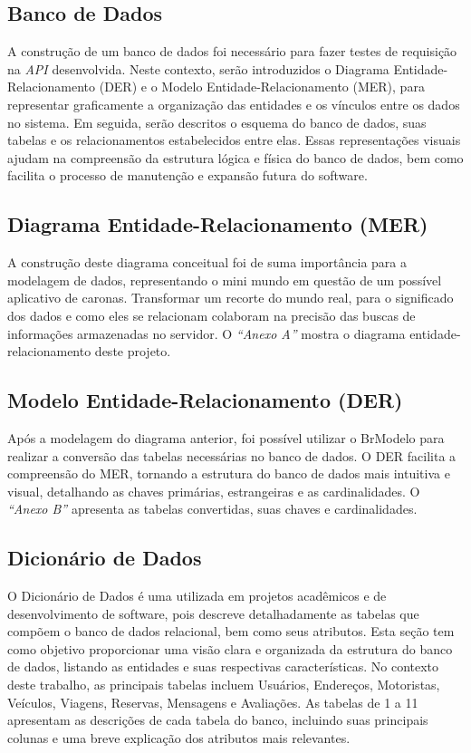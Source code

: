 \subsection{Banco de Dados}

A construção de um banco de dados foi necessário para fazer testes de requisição na \textit{API} desenvolvida. Neste contexto, serão introduzidos o Diagrama Entidade-Relacionamento (DER) e o Modelo Entidade-Relacionamento (MER), para representar graficamente a organização das entidades e os vínculos entre os dados no sistema. Em seguida, serão descritos o esquema do banco de dados, suas tabelas e os relacionamentos estabelecidos entre elas. Essas representações visuais ajudam na compreensão da estrutura lógica e física do banco de dados, bem como facilita o processo de manutenção e expansão futura do software.

\subsection{Diagrama Entidade-Relacionamento (MER)}

A construção deste diagrama conceitual foi de suma importância para a modelagem de dados, representando o mini mundo em questão de um possível aplicativo de caronas. Transformar um recorte do mundo real, para o significado dos dados e como eles se relacionam colaboram na precisão das buscas de informações armazenadas no servidor. O \textit{``Anexo A''} mostra o diagrama entidade-relacionamento deste projeto.


\subsection{Modelo Entidade-Relacionamento (DER)}

Após a modelagem do diagrama anterior, foi possível utilizar o BrModelo para realizar a conversão das tabelas necessárias no banco de dados. O DER facilita a compreensão do MER, tornando a estrutura do banco de dados mais intuitiva e visual, detalhando as chaves primárias, estrangeiras e as cardinalidades. O \textit{``Anexo B''} apresenta as tabelas convertidas, suas chaves e cardinalidades.

\subsection{Dicionário de Dados}

O Dicionário de Dados é uma utilizada em projetos acadêmicos e de desenvolvimento de software, pois descreve detalhadamente as tabelas que compõem o banco de dados relacional, bem como seus atributos. Esta seção tem como objetivo proporcionar uma visão clara e organizada da estrutura do banco de dados, listando as entidades e suas respectivas características. No contexto deste trabalho, as principais tabelas incluem Usuários, Endereços, Motoristas, Veículos, Viagens, Reservas, Mensagens e Avaliações. As tabelas de 1 a 11 apresentam as descrições de cada tabela do banco, incluindo suas principais colunas e uma breve explicação dos atributos mais relevantes.

